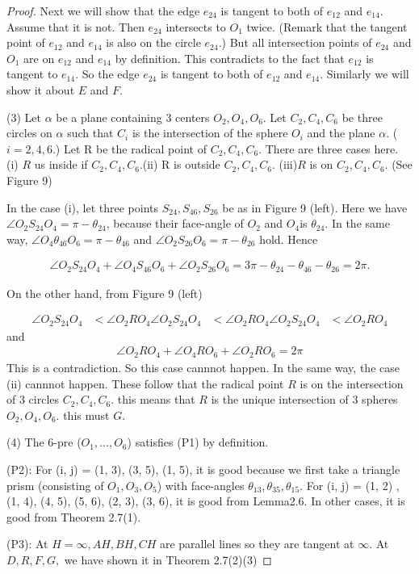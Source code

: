 \documentclass[dvipdfmx]{interact}
\theoremstyle{plain}%
\theoremstyle{definition}
\theoremstyle{remark}
\theoremstyle{problemstyle}
\begin{document}
\begin{proof}
Next we will show that the edge $e_{24}$ is tangent to both of $e_{12}$ and
 $e_{14}$. Assume that it is not. Then $e_{24}$ intersects to $O_1$
 twice.
(Remark that the tangent point of $e_{12}$ and $e_{14}$ is also on the
 circle $e_{24}$.) But all intersection points of $e_{24}$ and $O_1$ are
 on $e_{12}$ and $e_{14}$ by definition. This contradicts to the fact
 that $e_{12}$ is tangent to $e_{14}$. So the edge $e_{24}$ is tangent
 to both of $e_{12}$ and $e_{14}$. Similarly we will show it about $E$
 and $F$.

(3) Let $\alpha$ be a plane containing 3 centers $O_2, O_4, O_6$. Let
 $C_2, C_4, C_6$ be three circles on $\alpha$ such that $C_i$ is the
 intersection of the sphere $O_i$ and the plane $\alpha$. ($i=2, 4, 6$.)
Let R be the radical point of $C_2, C_4, C_6$. There are three cases
 here.
(i) $R$ us inside if $C_2, C_4, C_6$.(ii) R is outside $C_2, C_4, C_6$.
(iii)$R$ is on $C_2, C_4, C_6$. (See Figure 9)

In the case (i), let three points $S_{24}, S_{46}, S_{26}$ be as in Figure
 9 (left). Here we have $\angle O_2 S_{24} O_4 = \pi - \theta_{24}$,
because their face-angle of $O_2$ and $O_4$is $\theta_{24}$.
In the same way, $\angle O_4\theta_{46}O_6 = \pi - \theta_{46}$ and
$\angle O_2S_{26}O_6 = \pi-\theta_{26}$ hold. Hence

\begin{align*}
 \angle O_2 S_{24} O_4 + \angle O_4 S_{46} O_6 + \angle O_2 S_{26} O_6 = 3\pi -
 \theta_{24} - \theta_{46} - \theta_{26} = 2\pi.
\end{align*}

On the other hand, from Figure 9 (left)

\begin{align*}
 \angle O_2 S_{24} O_4 &< \angle O_2 R O_4
 \angle O_2 S_{24} O_4 &< \angle O_2 R O_4
 \angle O_2 S_{24} O_4 &< \angle O_2 R O_4
\end{align*}
and
\begin{align*}
 \angle O_2 R O_4 + \angle O_4 R O_6 + \angle O_2 R O_6 = 2\pi
\end{align*}
This is a contradiction. So this case cannnot happen. In the same way,
 the case (ii) cannnot happen. These follow that the radical point $R$
 is on the intersection of 3 circles $C_2, C_4, C_6.$ this means that
 $R$ is the unique intersection of 3 spheres $O_2, O_4, O_6$. this must
 $G$.

(4) The 6-pre ($O_1, ..., O_6$) satisfies (P1) by definition.

(P2): For (i, j) = (1, 3), (3, 5), (1, 5), it is good because we first
 take a triangle prism (consisting of $O_1, O_3, O_5$) with face-angles
 $\theta_{13}, \theta_{35}, \theta_{15}.$ For (i, j) = (1, 2)
, (1, 4), (4, 5), (5, 6), (2, 3), (3, 6), it is good from Lemma2.6. In
other cases, it is good from Theorem 2.7(1).

(P3): At $H = \infty, AH, BH, CH$ are parallel lines so they are tangent
 at $\infty$. At $D, R, F, G,$ we have shown it in Theorem 2.7(2)(3)
\end{proof}
\end{document}
